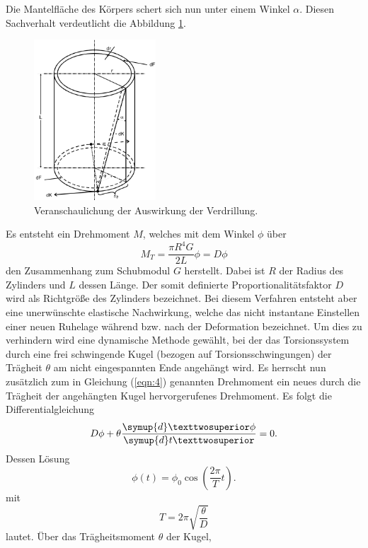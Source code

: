 Die Mantelfläche des Körpers schert sich nun unter einem Winkel $\alpha$. Diesen Sachverhalt verdeutlicht die Abbildung \ref{fig:3}.
\begin{figure}[H]
  \centering
  \includegraphics[height=6cm]{scherung3.png}
  \caption{Veranschaulichung der Auswirkung der Verdrillung. \cite{sample}}
  \label{fig:3}
\end{figure}
Es entsteht ein Drehmoment $M$, welches mit dem Winkel $\phi$ über
\begin{equation}
  M_T = \frac{\pi R^4 G}{2L} \phi = D \phi \label{eqn:4}
\end{equation}
den Zusammenhang zum Schubmodul $G$ herstellt.
Dabei ist $R$ der Radius des Zylinders und $L$ dessen Länge.
Der somit definierte Proportionalitätsfaktor $D$ wird als Richtgröße des Zylinders bezeichnet.
Bei diesem Verfahren entsteht aber eine unerwünschte elastische Nachwirkung, welche das nicht instantane Einstellen einer neuen Ruhelage während bzw. nach der Deformation bezeichnet.
Um dies zu verhindern wird eine dynamische Methode gewählt, bei der das Torsionssystem durch eine frei schwingende Kugel (bezogen auf Torsionsschwingungen) der Trägheit $\theta$ am nicht eingespannten Ende angehängt wird.
Es herrscht nun zusätzlich zum in Gleichung (\ref{eqn:4}) genannten Drehmoment ein neues durch die Trägheit der angehängten Kugel hervorgerufenes Drehmoment.
Es folgt die Differentialgleichung
\begin{equation}
  D \phi + \theta \frac{\symup{d}²\phi}{\symup{d}t²} = 0. \label{eqn1:1}
\end{equation}
Dessen Lösung
\begin{equation}
  \phi (t) = \phi_0\cos\left(\frac{2\pi}{T}t\right). \label{eqn:5}
\end{equation}
mit
\begin{equation}
  T = 2\pi\sqrt{\frac{\theta}{D}} \label{eqn:6}
\end{equation}
lautet.
Über das Trägheitsmoment $\theta$ der Kugel,
